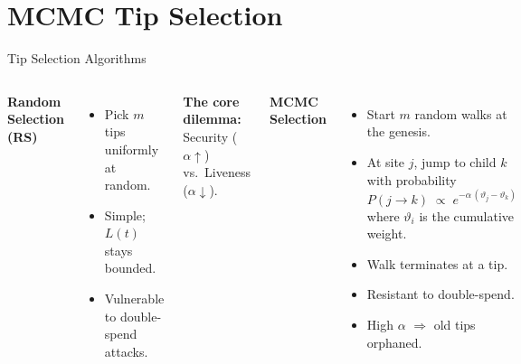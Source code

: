 \documentclass[aspectratio=169]{beamer}
\begin{document}
\section{MCMC Tip Selection}

\begin{frame}{Tip Selection Algorithms}
  \begin{columns}[T]
    \textbf{Random Selection (RS)}
    \begin{itemize}
      \item Pick $m$ tips uniformly at random.
      \item[$+$] Simple; $L(t)$ stays bounded.
      \item[$-$] Vulnerable to double-spend attacks.
    \end{itemize}

    \bigskip
    \textbf{The core dilemma:}\\
    Security ($\alpha\!\uparrow$) vs.\ Liveness ($\alpha\!\downarrow$).

    \textbf{MCMC Selection}
    \begin{itemize}
      \item Start $m$ random walks at the genesis.
      \item At site $j$, jump to child $k$ with probability
        \[
          P(j \!\to\! k) \;\propto\; e^{-\alpha\,(\vartheta_j - \vartheta_k)}
        \]
        where $\vartheta_i$ is the cumulative weight.
      \item Walk terminates at a tip.
      \item[$+$] Resistant to double-spend.
      \item[$-$] High $\alpha$ $\Rightarrow$ old tips orphaned.
    \end{itemize}
  \end{columns}
\end{frame}
\end{document}
